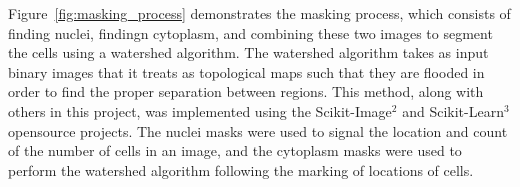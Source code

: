 \documentclass[12pt]{article}
\begin{document}
Figure~\ref{fig:masking_process} demonstrates the masking process, which consists of finding nuclei,
findingn cytoplasm, and combining these two images to segment the cells using a watershed algorithm.
The watershed algorithm takes as input binary images that it treats as topological maps such that
they are flooded in order to find the proper separation between regions. This method, along with
others in this project, was implemented using the Scikit-Image$^2$ and Scikit-Learn$^3$ opensource
projects. The nuclei masks were used to signal the location and count of the number of cells in an
image, and the cytoplasm masks were used to perform the watershed algorithm following the marking of
locations of cells.

\begin{figure}[H]
    \centering
    {
    }\hfill{
        }
\end{figure}
\end{document}
